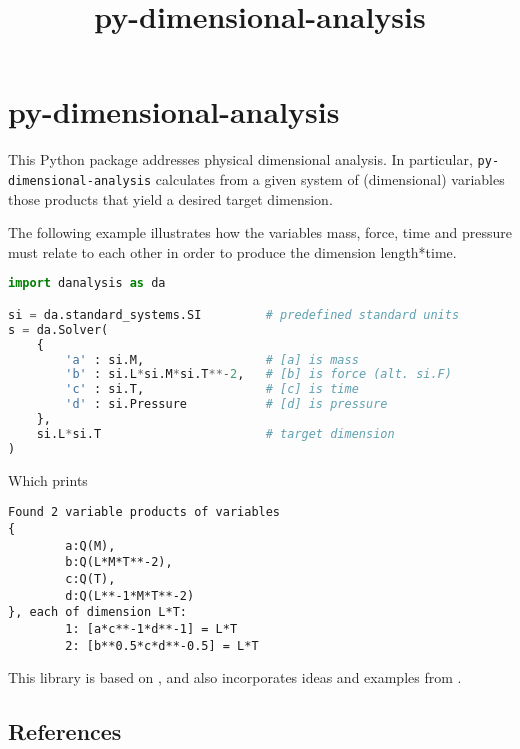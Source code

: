 \documentclass[11pt]{article}
\title{py-dimensional-analysis}
\date{}
\begin{document}
\maketitle

\section{py-dimensional-analysis}
This Python package addresses physical dimensional analysis. In particular, \texttt{py-dimensional-analysis} calculates from a given system of (dimensional) variables those products that yield a desired target dimension.


The following example illustrates how the variables mass, force, time and pressure must relate to each other in order to produce the dimension length*time.

\begin{lstlisting}[language=Python]
import danalysis as da

si = da.standard_systems.SI         # predefined standard units
s = da.Solver(
    {
        'a' : si.M,                 # [a] is mass
        'b' : si.L*si.M*si.T**-2,   # [b] is force (alt. si.F)
        'c' : si.T,                 # [c] is time
        'd' : si.Pressure           # [d] is pressure
    },
    si.L*si.T                       # target dimension
)
\end{lstlisting}
Which prints
\begin{lstlisting}
Found 2 variable products of variables
{
        a:Q(M),
        b:Q(L*M*T**-2),
        c:Q(T),
        d:Q(L**-1*M*T**-2)
}, each of dimension L*T:
        1: [a*c**-1*d**-1] = L*T
        2: [b**0.5*c*d**-0.5] = L*T
\end{lstlisting}

This library is based on \cite{szirtes2007applied}, and also incorporates ideas and examples from \cite{santiago2019first, sonin2001dimensional}.

\subsection{References}

\begingroup
\renewcommand{\section}[2]{}%

\endgroup
\end{document}
